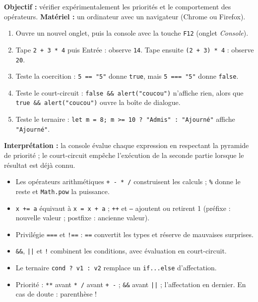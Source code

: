 \documentclass[11pt]{article}
\begin{document}
\begin{experience}
\textbf{Objectif :} vérifier expérimentalement les priorités et le comportement des opérateurs.
\textbf{Matériel :} un ordinateur avec un navigateur (Chrome ou Firefox).
\begin{enumerate}
\item Ouvre un nouvel onglet, puis la console avec la touche \texttt{F12} (onglet \emph{Console}).
\item Tape \texttt{2 + 3 * 4} puis Entrée : observe \texttt{14}. Tape ensuite \texttt{(2 + 3) * 4} : observe \texttt{20}.
\item Teste la coercition : \texttt{5 == "5"} donne \texttt{true}, mais \texttt{5 === "5"} donne \texttt{false}.
\item Teste le court-circuit : \texttt{false \&\& alert("coucou")} n'affiche rien, alors que \texttt{true \&\& alert("coucou")} ouvre la boîte de dialogue.
\item Teste le ternaire : \texttt{let m = 8; m >= 10 ? "Admis" : "Ajourné"} affiche \texttt{"Ajourné"}.
\end{enumerate}
\textbf{Interprétation :} la console évalue chaque expression en respectant la pyramide de priorité ; le court-circuit empêche l'exécution de la seconde partie lorsque le résultat est déjà connu.
\end{experience}

\begin{aretenir}
\begin{itemize}
\item Les opérateurs arithmétiques \texttt{+ - * /} construisent les calculs ; \texttt{\%} donne le reste et \texttt{Math.pow} la puissance.
\item \texttt{x += a} équivaut à \texttt{x = x + a} ; \texttt{++} et \texttt{--} ajoutent ou retirent 1 (préfixe : nouvelle valeur ; postfixe : ancienne valeur).
\item Privilégie \texttt{===} et \texttt{!==} : \texttt{==} convertit les types et réserve de mauvaises surprises.
\item \texttt{\&\&}, \texttt{||} et \texttt{!} combinent les conditions, avec évaluation en court-circuit.
\item Le ternaire \texttt{cond ? v1 : v2} remplace un \texttt{if...else} d'affectation.
\item Priorité : \texttt{**} avant \texttt{* /} avant \texttt{+ -} ; \texttt{\&\&} avant \texttt{||} ; l'affectation en dernier. En cas de doute : parenthèse !
\end{itemize}
\end{aretenir}
\end{document}
